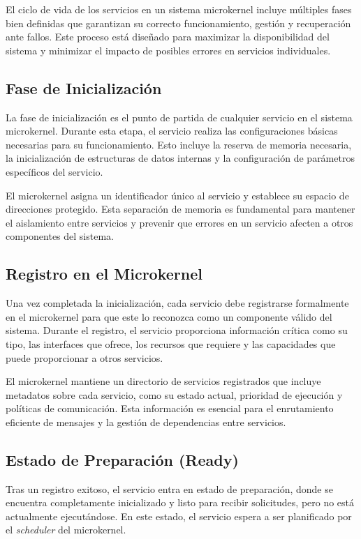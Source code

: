 \documentclass[12pt,a4paper]{article}
\begin{document}
El ciclo de vida de los servicios en un sistema microkernel incluye múltiples fases bien definidas que garantizan su correcto funcionamiento, gestión y recuperación ante fallos. Este proceso está diseñado para maximizar la disponibilidad del sistema y minimizar el impacto de posibles errores en servicios individuales.

\subsection{Fase de Inicialización}

La fase de inicialización es el punto de partida de cualquier servicio en el sistema microkernel. Durante esta etapa, el servicio realiza las configuraciones básicas necesarias para su funcionamiento. Esto incluye la reserva de memoria necesaria, la inicialización de estructuras de datos internas y la configuración de parámetros específicos del servicio.

El microkernel asigna un identificador único al servicio y establece su espacio de direcciones protegido. Esta separación de memoria es fundamental para mantener el aislamiento entre servicios y prevenir que errores en un servicio afecten a otros componentes del sistema.

\subsection{Registro en el Microkernel}

Una vez completada la inicialización, cada servicio debe registrarse formalmente en el microkernel para que este lo reconozca como un componente válido del sistema. Durante el registro, el servicio proporciona información crítica como su tipo, las interfaces que ofrece, los recursos que requiere y las capacidades que puede proporcionar a otros servicios.

El microkernel mantiene un directorio de servicios registrados que incluye metadatos sobre cada servicio, como su estado actual, prioridad de ejecución y políticas de comunicación. Esta información es esencial para el enrutamiento eficiente de mensajes y la gestión de dependencias entre servicios.

\subsection{Estado de Preparación (Ready)}

Tras un registro exitoso, el servicio entra en estado de preparación, donde se encuentra completamente inicializado y listo para recibir solicitudes, pero no está actualmente ejecutándose. En este estado, el servicio espera a ser planificado por el \textit{scheduler} del microkernel.
\end{document}
